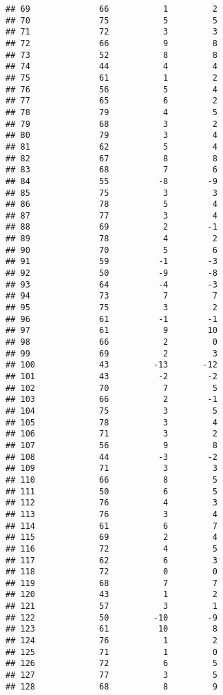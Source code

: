 \documentclass[]{article}
\begin{document}
\begin{verbatim}
## 69              66           1         2
## 70              75           5         5
## 71              72           3         3
## 72              66           9         8
## 73              52           8         8
## 74              44           4         4
## 75              61           1         2
## 76              56           5         4
## 77              65           6         2
## 78              79           4         5
## 79              68           3         2
## 80              79           3         4
## 81              62           5         4
## 82              67           8         8
## 83              68           7         6
## 84              55          -8        -9
## 85              75           3         3
## 86              78           5         4
## 87              77           3         4
## 88              69           2        -1
## 89              78           4         2
## 90              70           5         6
## 91              59          -1        -3
## 92              50          -9        -8
## 93              64          -4        -3
## 94              73           7         7
## 95              75           3         2
## 96              61          -1        -1
## 97              61           9        10
## 98              66           2         0
## 99              69           2         3
## 100             43         -13       -12
## 101             43          -2        -2
## 102             70           7         5
## 103             66           2        -1
## 104             75           3         5
## 105             78           3         4
## 106             71           3         2
## 107             56           9         8
## 108             44          -3        -2
## 109             71           3         3
## 110             66           8         5
## 111             50           6         5
## 112             76           4         3
## 113             76           3         4
## 114             61           6         7
## 115             69           2         4
## 116             72           4         5
## 117             62           6         3
## 118             72           0         0
## 119             68           7         7
## 120             43           1         2
## 121             57           3         1
## 122             50         -10        -9
## 123             61          10         8
## 124             76           1         2
## 125             71           1         0
## 126             72           6         5
## 127             77           3         5
## 128             68           8         9

\end{verbatim}
\end{document}
